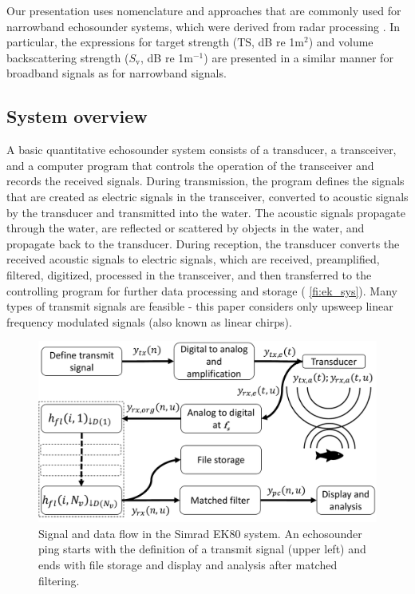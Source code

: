 \documentclass[preprint,12pt,TurnOnLineNumbers]{JASAnew}
\newcommand{\ek}{Simrad EK80}
\newcommand{\ts}{\textrm{TS}}
\newcommand{\sv}{S_{\textrm{v}}}
\begin{document}
Our presentation uses nomenclature and approaches that are commonly used for narrowband echosounder systems, which were derived from radar processing \citep{cook1967}. In particular, the expressions for target strength ($\ts$, dB re 1m${^2}$) and volume backscattering strength ($\sv$, dB re 1m$^{-1}$) \citep{MacLennan2002consistent} are presented in a similar manner for broadband signals as for narrowband signals.

\subsection{System overview}
A basic quantitative echosounder system consists of a transducer, a transceiver, and a computer program that controls the operation of the transceiver and records the received signals. During transmission, the program defines the signals that are created as electric signals in the transceiver, converted to acoustic signals by the transducer and transmitted into the water. The acoustic signals propagate through the water, are reflected or scattered by objects in the water, and propagate back to the transducer. During reception, the transducer converts the received acoustic signals to electric signals, which are received, preamplified, filtered, digitized, processed in the transceiver, and then transferred to the controlling program for further data processing and storage ( \autoref{fi:ek_sys}). Many types of transmit signals are feasible - this paper considers only upsweep linear frequency modulated signals (also known as linear chirps).

\begin{figure}
\includegraphics[width=16cm]{Fig_ek_sys}
\caption{\label{fi:ek_sys} Signal and data flow in the \ek{} system. An echosounder ping starts with the definition of a transmit signal (upper left) and ends with file storage and display and analysis after matched filtering.}
\end{figure}
\end{document}
